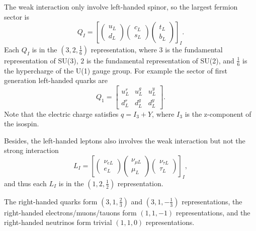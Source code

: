 \documentclass[aps,prb,superscriptaddress,nofootinbib]{revtex4}
\begin{document}
The weak interaction only involve left-handed spinor, so the largest fermion sector is
\begin{equation}
	Q_I = \left[
		\begin{pmatrix} u_L \\ d_L \end{pmatrix} 
		\begin{pmatrix} c_L \\ s_L \end{pmatrix} 
		\begin{pmatrix} t_L \\ b_L \end{pmatrix}
	\right]_I.
\end{equation}
Each $Q_I$ is in the $\left(3,2,\frac{1}{6}\right)$ representation, where $3$ is the fundamental representation of SU(3), $2$ is the fundamental representation of SU(2), and $\frac{1}{6}$ is the hypercharge of the U(1) gauge group.
For example the sector of first generation left-handed quarks are
\begin{equation}
	Q_1 = \begin{bmatrix}
		u_L^r & u_L^g & u_L^y \\ d_L^r & d_L^g & d_L^y
	\end{bmatrix}.
\end{equation}
Note that the electric charge satisfies $q = I_3 + Y$, where $I_3$ is the z-component of the isospin.

Besides, the left-handed leptons also involves the weak interaction but not the strong interaction
\begin{equation}
	L_I = \left[
		\begin{pmatrix} \nu_{e L} \\ e_L \end{pmatrix} 
		\begin{pmatrix} \nu_{\mu L} \\ \mu_L \end{pmatrix} 
		\begin{pmatrix} \nu_{\tau L} \\ \tau_L \end{pmatrix}
	\right]_I,
\end{equation}
and thus each $L_I$ is in the $\left(1,2,\frac{1}{2}\right)$ representation.

The right-handed quarks form $\left(3,1,\frac{2}{3}\right)$ and $\left(3,1,-\frac{1}{3}\right)$ representations, the right-handed electrons/muons/tauons form $\left(1,1,-1\right)$ representations, and the right-handed neutrinos form trivial $\left(1,1,0\right)$ representations.
\end{document}
